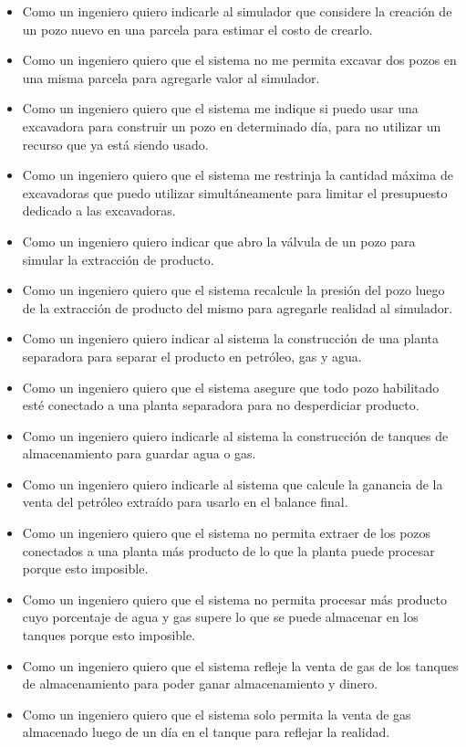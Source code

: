 \begin{itemize}
  \item Como un ingeniero quiero indicarle al simulador que considere la creación de un pozo nuevo en una parcela para estimar el costo de crearlo.
  \item Como un ingeniero quiero que el sistema no me permita excavar dos pozos en una misma parcela para agregarle valor al simulador.
  \item Como un ingeniero quiero que el sistema me indique si puedo usar una excavadora para construir un pozo en determinado día, para no utilizar un recurso que ya está siendo usado.
  \item Como un ingeniero quiero que el sistema me restrinja la cantidad máxima de excavadoras que puedo utilizar simultáneamente para limitar el presupuesto dedicado a las excavadoras.
  \item Como un ingeniero quiero indicar que abro la válvula de un pozo para simular la extracción de producto.
  \item Como un ingeniero quiero que el sistema recalcule la presión del pozo luego de la extracción de producto del mismo para agregarle realidad al simulador.
  \item Como un ingeniero quiero indicar al sistema la construcción de una planta separadora para separar el producto en petróleo, gas y agua.
  \item Como un ingeniero quiero que el sistema asegure que todo pozo habilitado esté conectado a una planta separadora para no desperdiciar producto.
  \item Como un ingeniero quiero indicarle al sistema la construcción de tanques de almacenamiento para guardar agua o gas.
  \item Como un ingeniero quiero indicarle al sistema que calcule la ganancia de la venta del petróleo extraído para usarlo en el balance final.
  \item Como un ingeniero quiero que el sistema no permita extraer de los pozos conectados a una planta más producto de lo que la planta puede procesar porque esto imposible.
  \item Como un ingeniero quiero que el sistema no permita procesar más producto cuyo porcentaje de agua y gas supere lo que se puede almacenar en los tanques porque esto imposible.
  \item Como un ingeniero quiero que el sistema refleje la venta de gas de los tanques de almacenamiento para poder ganar almacenamiento y dinero.
  \item Como un ingeniero quiero que el sistema solo permita la venta de gas almacenado luego de un día en el tanque para reflejar la realidad.

\end{itemize}
